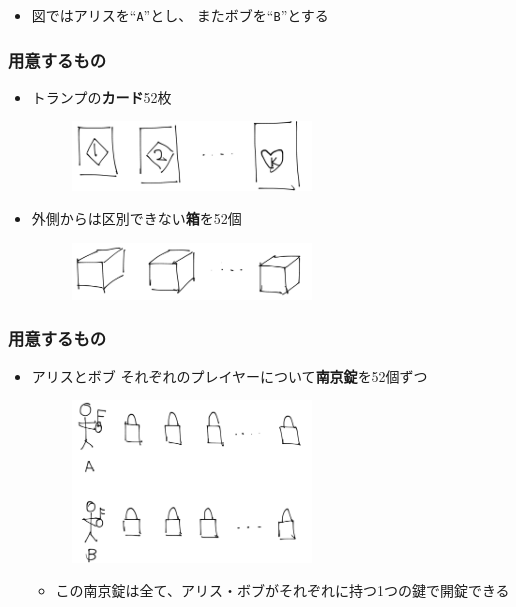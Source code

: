 \begin{frame}
  \begin{itemize}
    \item 図ではアリスを``\texttt{A}''とし、
    またボブを``\texttt{B}''とする
  \end{itemize}
\end{frame}

\begin{frame}
  \frametitle{用意するもの}

  \pause
  \begin{itemize}
    \item<+-> トランプの\textbf{カード}52枚
    \begin{figure}[h]
      \includegraphics[width=0.6\textwidth]{img/cards.png}
    \end{figure}
   
    \item<+-> 外側からは区別できない\textbf{箱}を52個
    \begin{figure}[h]
      \includegraphics[width=0.6\textwidth]{img/boxes.png}
    \end{figure}
  \end{itemize}
\end{frame}

\begin{frame}
  \frametitle{用意するもの}

  \begin{itemize}
    \item<+-> アリスとボブ
    それぞれのプレイヤーについて\textbf{南京錠}を52個ずつ
    \begin{figure}[h]
      \includegraphics[width=0.6\textwidth]{img/padlocks.png}
    \end{figure}
    \begin{itemize}
      \item この南京錠は全て、アリス・ボブがそれぞれに持つ1つの鍵で開錠できる
    \end{itemize}    
  \end{itemize}
\end{frame}

